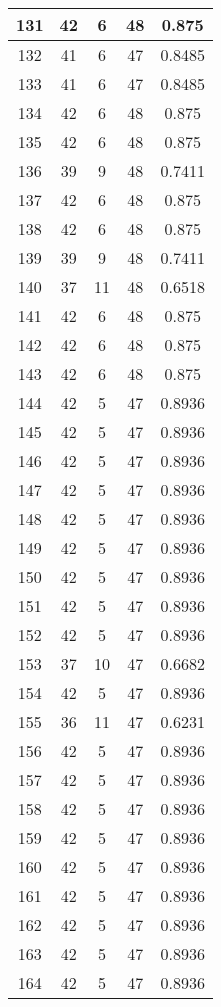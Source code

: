 \documentclass[letterpaper, 12pt]{article}
\begin{document}
\begin{longtable}{|c|c|c|c|c|}
\hline
131 & 42 & 6 & 48 & 0.875 \\
\hline
132 & 41 & 6 & 47 & 0.8485 \\
\hline
133 & 41 & 6 & 47 & 0.8485 \\
\hline
134 & 42 & 6 & 48 & 0.875 \\
\hline
135 & 42 & 6 & 48 & 0.875 \\
\hline
136 & 39 & 9 & 48 & 0.7411 \\
\hline
137 & 42 & 6 & 48 & 0.875 \\
\hline
138 & 42 & 6 & 48 & 0.875 \\
\hline
139 & 39 & 9 & 48 & 0.7411 \\
\hline
140 & 37 & 11 & 48 & 0.6518 \\
\hline
141 & 42 & 6 & 48 & 0.875 \\
\hline
142 & 42 & 6 & 48 & 0.875 \\
\hline
143 & 42 & 6 & 48 & 0.875 \\
\hline
144 & 42 & 5 & 47 & 0.8936 \\
\hline
145 & 42 & 5 & 47 & 0.8936 \\
\hline
146 & 42 & 5 & 47 & 0.8936 \\
\hline
147 & 42 & 5 & 47 & 0.8936 \\
\hline
148 & 42 & 5 & 47 & 0.8936 \\
\hline
149 & 42 & 5 & 47 & 0.8936 \\
\hline
150 & 42 & 5 & 47 & 0.8936 \\
\hline
151 & 42 & 5 & 47 & 0.8936 \\
\hline
152 & 42 & 5 & 47 & 0.8936 \\
\hline
153 & 37 & 10 & 47 & 0.6682 \\
\hline
154 & 42 & 5 & 47 & 0.8936 \\
\hline
155 & 36 & 11 & 47 & 0.6231 \\
\hline
156 & 42 & 5 & 47 & 0.8936 \\
\hline
157 & 42 & 5 & 47 & 0.8936 \\
\hline
158 & 42 & 5 & 47 & 0.8936 \\
\hline
159 & 42 & 5 & 47 & 0.8936 \\
\hline
160 & 42 & 5 & 47 & 0.8936 \\
\hline
161 & 42 & 5 & 47 & 0.8936 \\
\hline
162 & 42 & 5 & 47 & 0.8936 \\
\hline
163 & 42 & 5 & 47 & 0.8936 \\
\hline
164 & 42 & 5 & 47 & 0.8936 \\

\end{longtable}
\end{document}
